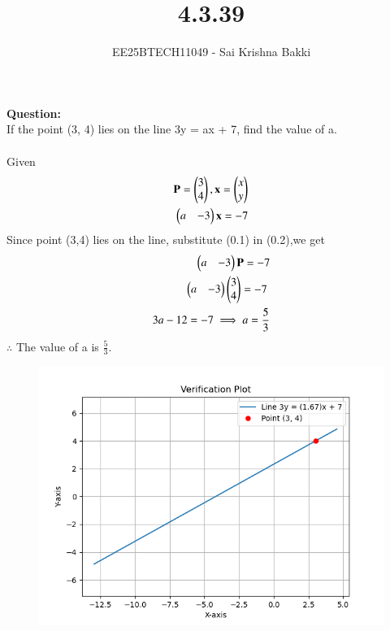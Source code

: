\documentclass[journal]{IEEEtran}
\begin{document}

\vspace{3cm}

\title{4.3.39}
\author{EE25BTECH11049 - Sai Krishna Bakki}
 \maketitle
{\let\newpage\relax\maketitle}

\renewcommand{\thefigure}{\theenumi}
\renewcommand{\thetable}{\theenumi}
\setlength{\intextsep}{10pt} %


\renewcommand{\thetable}{\theenumi}
\textbf{Question:}\\
If the point (3, 4) lies on the line 3y = ax + 7, find the value of a.\\
\solution\\
Given
\begin{align}
    \mathbf{P}=\begin{pmatrix}3\\4\end{pmatrix},\mathbf{x}=\begin{pmatrix}x\\y\end{pmatrix}\\
    \begin{pmatrix}a & -3\end{pmatrix}\mathbf{x}=-7
\end{align}
Since point (3,4) lies on the line, substitute (0.1) in (0.2),we get
\begin{align}
        \begin{pmatrix}a & -3\end{pmatrix}\mathbf{P}=-7\\
        \begin{pmatrix}a & -3\end{pmatrix}\begin{pmatrix}3\\4\end{pmatrix}=-7\ \\
        3a-12=-7\implies a=\frac{5}{3}
\end{align}
$\therefore$ The value of a is \textbf{$\frac{5}{3}$}.
\newpage
 \begin{figure}
    \centering
    \includegraphics[width=0.9\columnwidth]{figs/Figure_1.png}
    \label{fig:placeholder}
    \caption{}
\end{figure}
\end{document}
